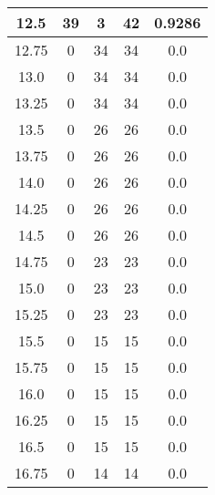 \documentclass[letterpaper, 12pt]{article}
\begin{document}
\begin{longtable}{|c|c|c|c|c|}
\hline
12.5 & 39 & 3 & 42 & 0.9286 \\
\hline
12.75 & 0 & 34 & 34 & 0.0 \\
\hline
13.0 & 0 & 34 & 34 & 0.0 \\
\hline
13.25 & 0 & 34 & 34 & 0.0 \\
\hline
13.5 & 0 & 26 & 26 & 0.0 \\
\hline
13.75 & 0 & 26 & 26 & 0.0 \\
\hline
14.0 & 0 & 26 & 26 & 0.0 \\
\hline
14.25 & 0 & 26 & 26 & 0.0 \\
\hline
14.5 & 0 & 26 & 26 & 0.0 \\
\hline
14.75 & 0 & 23 & 23 & 0.0 \\
\hline
15.0 & 0 & 23 & 23 & 0.0 \\
\hline
15.25 & 0 & 23 & 23 & 0.0 \\
\hline
15.5 & 0 & 15 & 15 & 0.0 \\
\hline
15.75 & 0 & 15 & 15 & 0.0 \\
\hline
16.0 & 0 & 15 & 15 & 0.0 \\
\hline
16.25 & 0 & 15 & 15 & 0.0 \\
\hline
16.5 & 0 & 15 & 15 & 0.0 \\
\hline
16.75 & 0 & 14 & 14 & 0.0 \\
\hline
\end{longtable}
\end{document}
